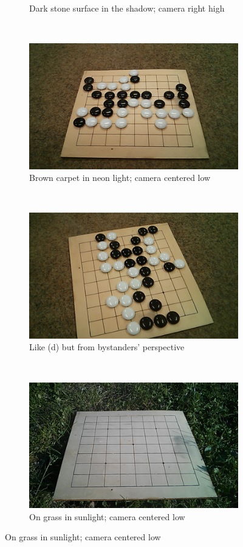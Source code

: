 \begin{figure}
\begin{subfigure}[b]{0.3\textwidth}
				\caption{Dark stone surface in the shadow; camera right high}
		\end{subfigure}
		\\
		\begin{subfigure}[b]{0.3\textwidth}
				\includegraphics[width=\textwidth]{images/neonFloor_many_centerLow.png}
				\caption{Brown carpet in neon light; camera centered low}
		\end{subfigure}
		~
		\begin{subfigure}[b]{0.3\textwidth}
				\includegraphics[width=\textwidth]{images/neonFloor_many_centerLow_rotated.png}
				\caption{Like (d) but from bystanders'	 perspective}
		\end{subfigure}
		~
		\begin{subfigure}[b]{0.3\textwidth}
			\includegraphics[width=\textwidth]{images/sunnyGrass_empty_centerLow.png}
			\caption{On grass in sunlight; camera centered low}
		\end{subfigure}


\end{figure}
